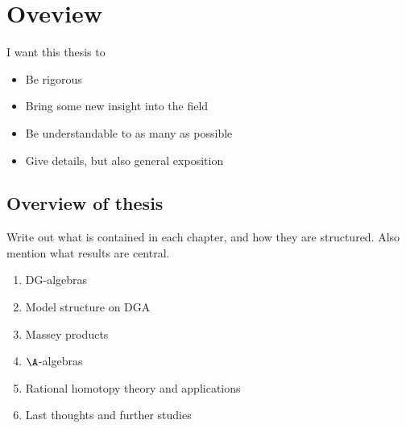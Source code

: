 \section{Oveview}

I want this thesis to 
\begin{itemize}
    \item Be rigorous
    \item Bring some new insight into the field
    \item Be understandable to as many as possible
    \item Give details, but also general exposition
\end{itemize}

\subsection*{Overview of thesis}
Write out what is contained in each chapter, and how they are structured. Also mention what results are central. 
\begin{enumerate}
    \item DG-algebras
    \item Model structure on DGA
    \item Massey products
    \item $\A$-algebras
    \item Rational homotopy theory and applications
    \item Last thoughts and further studies
\end{enumerate}




